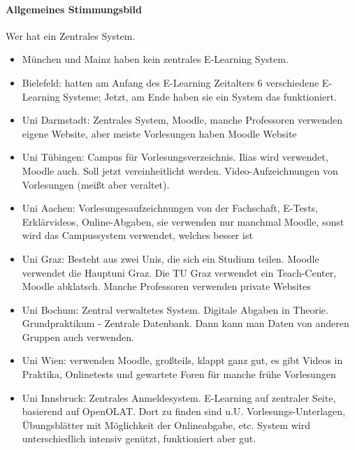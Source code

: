 			 \paragraph{Allgemeines Stimmungsbild}
			   Wer hat ein Zentrales System. \\

				\begin{itemize}
					\item München und Mainz haben kein zentrales E-Learning System.  \\
					\item Bielefeld: hatten am Anfang des E-Learning Zeitalters 6 verschiedene E-Learning Systeme;
						Jetzt, am Ende haben sie ein System das funktioniert. \\
					\item Uni Darmstadt: Zentrales System, Moodle, manche Professoren verwenden eigene Website, aber meiste Vorlesungen haben Moodle Website \\
					\item Uni Tübingen: Campus für Vorlesungsverzeichnis. Ilias wird verwendet, Moodle auch. Soll jetzt vereinheitlicht werden. Video-Aufzeichnungen von Vorlesungen (meißt aber veraltet). \\
					\item Uni Aachen: Vorlesungesaufzeichnungen von der Fachschaft, E-Tests, Erklärvideos, Online-Abgaben, sie verwenden nur manchmal Moodle, sonst wird das Campussystem verwendet, welches besser ist \\
					\item Uni Graz: Besteht aus zwei Unis, die sich ein Studium teilen. Moodle verwendet die Hauptuni Graz. Die TU Graz verwendet ein Teach-Center, Moodle abklatsch. Manche Professoren verwenden private Websites \\
					\item Uni Bochum: Zentral verwaltetes System. Digitale Abgaben in Theorie. Grundpraktikum - Zentrale Datenbank. Dann kann man Daten von anderen Gruppen auch verwenden. \\
					\item Uni Wien: verwenden Moodle, großteils, klappt ganz gut, es gibt Videos in Praktika, Onlinetests und gewartete Foren für manche frühe Vorlesungen \\
					\item Uni Innsbruck: Zentrales Anmeldesystem. E-Learning auf zentraler Seite, basierend auf OpenOLAT. Dort zu finden sind u.U. Vorlesungs-Unterlagen, Übungsblätter mit Möglichkeit der Onlineabgabe, etc. System wird unterschiedlich intensiv genützt, funktioniert aber gut. \\

\end{itemize}
